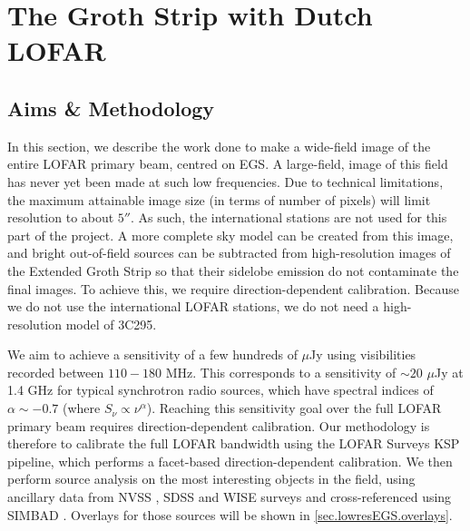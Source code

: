 \chapter{The Groth Strip with Dutch LOFAR}\label{section.EGS.lowres}
\minitoc
\section{Aims \& Methodology}

\pg
In this section, we describe the work done to make a wide-field image of the entire LOFAR primary beam, centred on EGS. A large-field, image of this field has never yet been made at such low frequencies. Due to technical limitations, the maximum attainable image size (in terms of number of pixels) will limit resolution to about $5''$. As such, the international stations are not used for this part of the project.
A more complete sky model can be created from this image, and %
bright out-of-field sources can be subtracted from high-resolution images of the Extended Groth Strip so that their sidelobe emission do not contaminate the final images. To achieve this, we require direction-dependent calibration. Because we do not use the international LOFAR stations, we do not need a high-resolution model of 3C295. %

\pg
We aim to achieve a sensitivity of a few hundreds of $\mu$Jy using visibilities recorded between $110-180$ MHz. This corresponds to a sensitivity of $\sim20$ $\mu$Jy at 1.4 GHz for typical synchrotron radio sources, which have spectral indices of $\alpha\sim -0.7$ (where $S_\nu \propto \nu^\alpha$). Reaching this sensitivity goal over the full LOFAR primary beam requires direction-dependent calibration.
Our methodology is therefore to calibrate the full LOFAR bandwidth using the LOFAR Surveys KSP pipeline, which performs a facet-based direction-dependent calibration. We then perform source analysis on the most interesting objects in the field, using ancillary data from NVSS , SDSS  and WISE  surveys and cross-referenced using SIMBAD . Overlays for those sources will be shown in \cref{sec.lowresEGS.overlays}.


